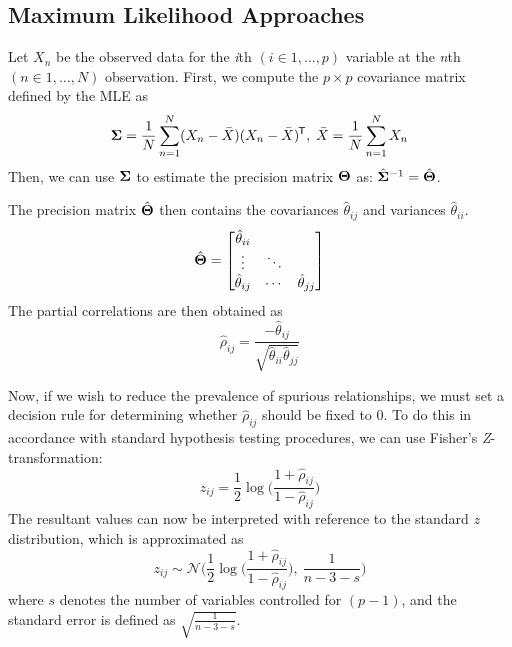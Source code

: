 \subsection{Maximum Likelihood Approaches}
Let $X_n$ be the observed data for the \textit{i}th $(i \in 1,\ldots,p)$ variable at the \textit{n}th $(n \in 1,\ldots,N)$ observation. First, we compute the $p \times p$ covariance matrix defined by the MLE as
\begin{equation}
    \bm{\Sigma} = \frac{1}{N} \sum_{n=1}^N (X_n - \Bar{X})(X_n - \Bar{X})^{\mkern-1.5mu\mathsf{T}}, \; \Bar{X} = \frac{1}{N} \sum_{n=1}^N X_n
\end{equation}
Then, we can use $\bm{\Sigma}$ to estimate the precision matrix $\bm{\Theta}$ as: $\hat{\bm{\Sigma}}^{-1} = \hat{\bm{\Theta}}$. 

The precision matrix $\hat{\bm{\Theta}}$ then contains the covariances $\hat{\theta}_{ij}$ and variances $\hat{\theta}_{ii}$.
\begin{equation}
    \hat{\bm{\Theta}} = 
    \begin{bmatrix}
    \hat{\theta}_{ii} &  &  \\
    \vdots & \ddots &  \\
    \hat{\theta}_{ij} & \cdots & \hat{\theta}_{jj}
    \end{bmatrix}
\end{equation}
The partial correlations are then obtained as
\begin{equation}
    \hat{\rho}_{ij} = \frac{-\hat{\theta}_{ij}}{\sqrt{\hat{\theta}_{ii}\hat{\theta}_{jj}}}
\end{equation}

Now, if we wish to reduce the prevalence of spurious relationships, we must set a decision rule for determining whether $\hat{\rho}_{ij}$ should be fixed to 0. To do this in accordance with standard hypothesis testing procedures, we can use Fisher's \textit{Z}-transformation:
\begin{equation}
    z_{ij} = \frac{1}{2} \log \Big(\frac{1 + \hat{\rho}_{ij}}{1 - \hat{\rho}_{ij}} \Big)
\end{equation}
The resultant values can now be interpreted with reference to the standard \textit{z} distribution, which is approximated as
\begin{equation}
    z_{ij} \sim \mathcal{N} \Bigg(\frac{1}{2} \log \Big(\frac{1 + \hat{\rho}_{ij}}{1 - \hat{\rho}_{ij}} \Big), \: \frac{1}{n - 3 - s} \Bigg)
\end{equation}
where $s$ denotes the number of variables controlled for $(p - 1)$, and the standard error is defined as $\sqrt{\frac{1}{n - 3 - s}}$.

